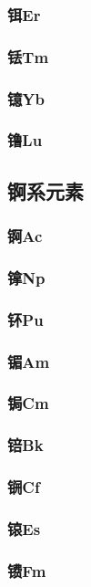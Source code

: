 \documentclass[UTF8]{../03-Chemistry}
\begin{document}
        \subsubsection{铒Er}
        \subsubsection{铥Tm}
        \subsubsection{镱Yb}
        \subsubsection{镥Lu}
    \subsection{锕系元素}
        \subsubsection{锕Ac}
        \subsubsection{镎Np}
        \subsubsection{钚Pu}
        \subsubsection{镅Am}
        \subsubsection{锔Cm}
        \subsubsection{锫Bk}
        \subsubsection{锎Cf}
        \subsubsection{锿Es}
        \subsubsection{镄Fm}
\end{document}
